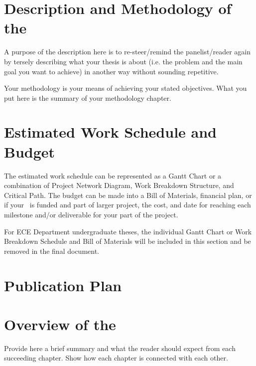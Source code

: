 \section{Description and Methodology of the \documentType}

A purpose of the description here is to re-steer/remind the panelist/reader again by tersely describing what your thesis is about (i.e. the problem and the main goal you want to achieve) in another way without sounding repetitive. 

Your methodology is your means of achieving your stated objectives. What you put here is the summary of your methodology chapter.



\graytx{\blindtext}


\ifFinished
\else

\section{Estimated Work Schedule and Budget}

The estimated work schedule can be represented as a Gantt Chart or a combination of Project Network Diagram, Work Breakdown Structure, and Critical Path.  The budget can be made into a Bill of Materials, financial plan, or if your \documentType \ is funded and part of larger project, the cost, and date for reaching each milestone and/or deliverable for your part of the project.

For ECE Department undergraduate theses, the individual Gantt Chart or Work Breakdown Schedule and Bill of Materials will be included in this section and be removed in the final document.

\graytx{\blindtext}

\ifPhD
\section{Publication Plan}
\graytx{\blindtext}
\fi

\fi


\section{Overview of the \documentType}

Provide here a brief summary and what the reader should expect from each succeeding chapter.  Show how each chapter is connected with each other.

